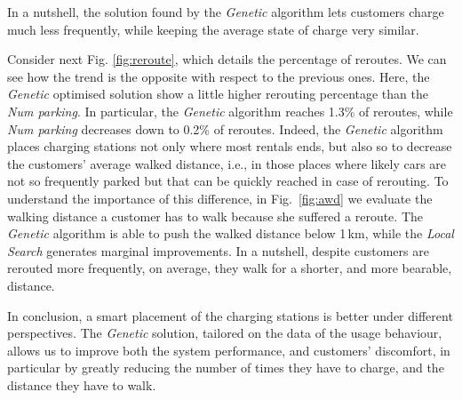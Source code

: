In a nutshell, the solution found by the \textit{Genetic} algorithm lets customers charge much less frequently, while keeping the average state of charge very similar. 

Consider next Fig. \ref{fig:reroute}, which details the percentage of reroutes. We can see how the trend is the opposite with respect to the previous ones. Here, the \textit{Genetic} optimised solution show a little higher rerouting percentage than the \textit{Num parking}. 
In particular, the \textit{Genetic} algorithm 
reaches 1.3\% of reroutes, while \textit{Num parking} decreases down to 0.2\% of reroutes. Indeed, the \textit{Genetic} algorithm places charging stations not only where most rentals ends, but also so to decrease the customers' average walked distance, i.e., in those places where likely cars are not so frequently parked but that can be quickly reached in case of rerouting.
To understand the importance of this difference, in Fig.~\ref{fig:awd} we evaluate the walking distance a customer has to walk because she suffered a reroute.  
The \textit{Genetic} algorithm is able to push the walked distance below 1\,km, while the \textit{Local Search} generates marginal improvements.
In a nutshell, despite customers are rerouted more frequently, on average, they walk for a shorter, and  more bearable, distance.


In conclusion, a smart placement of the charging stations is better under different perspectives.  The \textit{Genetic} solution, tailored on the data of the usage behaviour, allows us to improve both the system performance, and customers' discomfort, in particular by greatly reducing the number of times they have to charge, and the distance they have to walk.


